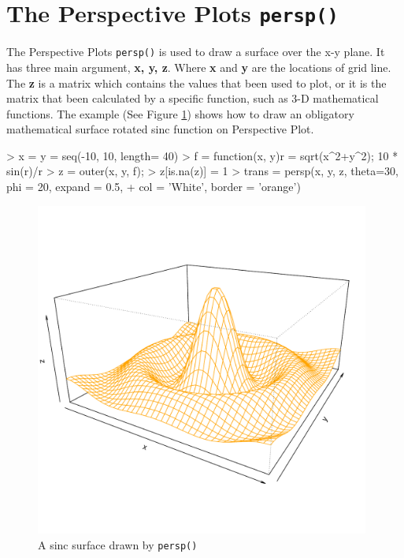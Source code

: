 \documentclass[11pt]{report}
\begin{document}
\section{The Perspective Plots \texttt{persp()}}
The Perspective Plots \texttt{persp()} is used to draw a surface over the x-y plane.  
It has three main argument, \textbf{x, y, z}. Where \textbf{x} and \textbf{y} are the locations of grid line. The \textbf{z} is a matrix which contains the values that been used to plot, or it is the matrix that been calculated by a specific function, such as 3-D mathematical functions. The example (See Figure \ref{figure_3.1}) shows how to draw an obligatory mathematical surface rotated sinc function on Perspective Plot.
\begin{Schunk}
\begin{Sinput}
> x = y = seq(-10, 10, length= 40)
> f = function(x, y){r = sqrt(x^2+y^2); 10 * sin(r)/r }
> z = outer(x, y, f);  
> z[is.na(z)] = 1
> trans = persp(x, y, z, theta=30, phi = 20, expand = 0.5,
+               col = 'White', border = 'orange')
\end{Sinput}
\end{Schunk}
\begin{figure}[h]
	\begin{center}
		\includegraphics[height = 11cm, width = 11cm]{figure/standalone_1.pdf}
		\caption{A sinc surface drawn by \texttt{persp()}}
		\label{figure_3.1}
	\end{center}
\end{figure}
\end{document}
